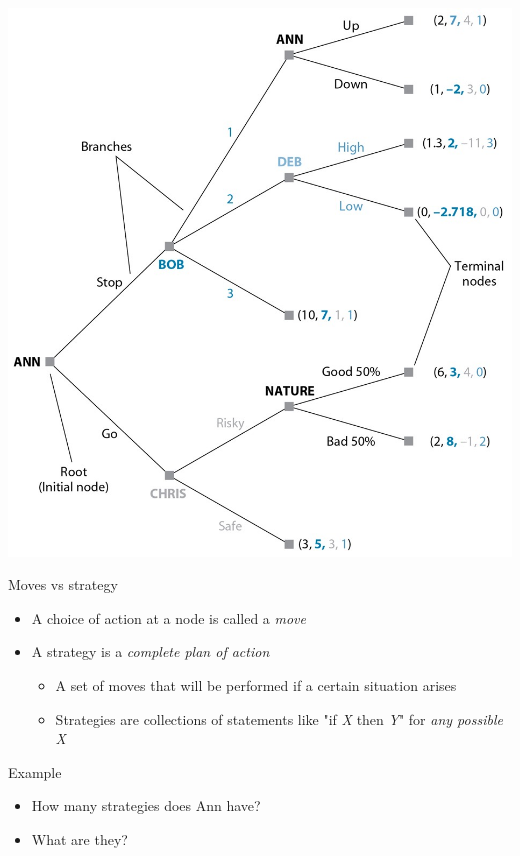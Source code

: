\documentclass[10pt]{beamer}
\begin{document}
\begin{frame}[label={sec:orgce36290}]{}
\begin{center}
\includegraphics[height=\textheight]{./img/GAMES4_FIG03.01.jpg}
\end{center}
\end{frame}

\begin{frame}[label={sec:orgb8db8b7}]{}
\alert{Moves vs strategy}
\begin{itemize}
\item A choice of action at a node is called a \emph{move}
\item A strategy is a \emph{complete plan of action}
\begin{itemize}
\item A set of moves that will be performed if a certain situation arises
\item Strategies are collections of statements like "if \emph{X} then \emph{Y}" for \emph{any possible X}
\end{itemize}
\end{itemize}
\end{frame}

\begin{frame}[label={sec:orgcc19ba1}]{}
\alert{Example}
\begin{itemize}
\item How many strategies does Ann have?
\item What are they?
\end{itemize}
\end{frame}
\end{document}
